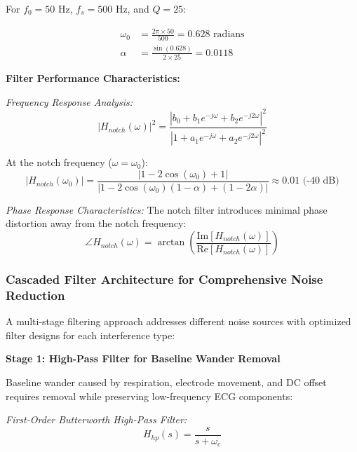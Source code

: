 \documentclass[12pt,a4paper]{article}
\begin{document}
For $f_0 = 50$ Hz, $f_s = 500$ Hz, and $Q = 25$:

\begin{align*}
\omega_0 &= \frac{2\pi \times 50}{500} = 0.628 \text{ radians}\\
\alpha &= \frac{\sin(0.628)}{2 \times 25} = 0.0118
\end{align*}

\vspace{0.5cm}

\textbf{Filter Performance Characteristics:}

\textit{Frequency Response Analysis:}
\begin{equation*}
|H_{notch}(\omega)|^2 = \frac{|b_0 + b_1 e^{-j\omega} + b_2 e^{-j2\omega}|^2}{|1 + a_1 e^{-j\omega} + a_2 e^{-j2\omega}|^2}
\end{equation*}

At the notch frequency ($\omega = \omega_0$):
\begin{equation*}
|H_{notch}(\omega_0)| = \frac{|1 - 2\cos(\omega_0) + 1|}{|1 - 2\cos(\omega_0)(1-\alpha) + (1-2\alpha)|} \approx 0.01 \text{ (-40 dB)}
\end{equation*}

\textit{Phase Response Characteristics:}
The notch filter introduces minimal phase distortion away from the notch frequency:
\begin{equation*}
\angle H_{notch}(\omega) = \arctan\left(\frac{\text{Im}[H_{notch}(\omega)]}{\text{Re}[H_{notch}(\omega)]}\right)
\end{equation*}

\subsubsection{Cascaded Filter Architecture for Comprehensive Noise Reduction}

A multi-stage filtering approach addresses different noise sources with optimized filter designs for each interference type:

\vspace{0.5cm}

\textbf{Stage 1: High-Pass Filter for Baseline Wander Removal}

Baseline wander caused by respiration, electrode movement, and DC offset requires removal while preserving low-frequency ECG components:

\textit{First-Order Butterworth High-Pass Filter:}
\begin{equation*}
H_{hp}(s) = \frac{s}{s + \omega_c}
\end{equation*}
\end{document}
